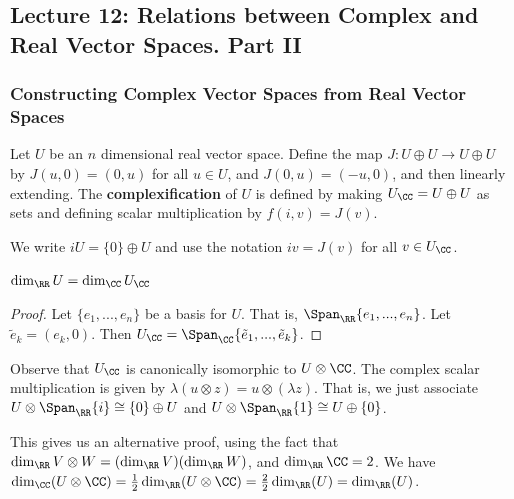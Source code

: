 \subsection{Lecture 12: Relations between Complex and Real Vector Spaces. Part II}
\subsubsection{Constructing Complex Vector Spaces from Real Vector Spaces}
\begin{defn}
    Let $U$ be an $n$ dimensional real vector space. Define the map $J : U\oplus U \to U\oplus U$ by $J(u,0) = (0,u)$ for all $u\in U$, and $J(0,u)=(-u,0)$, and then linearly extending. The \textbf{complexification} of $U$ is defined by making $U_{\CC} = U\oplus U$ as sets and defining scalar multiplication by $f(i,v) = J(v)$.
\end{defn}
\begin{remark*}
    We write $iU =\{0\}\oplus U$ and use the notation $iv = J(v)$ for all $v\in U_{\CC}$. 
\end{remark*}
\begin{lemma}
    $\dim_{\RR} U = \dim_{\CC} U_{\CC}$
\end{lemma}
\begin{proof}
    Let $\{e_1,...,e_n\}$ be a basis for $U$. That is, $\Span_{\RR}\{e_1,...,e_n\}$. Let $\tilde{e}_k = (e_k,0)$. Then $U_{\CC}=\Span_{\CC}\{\tilde{e}_1,...,\tilde{e}_k\}$.
\end{proof}
\begin{remark*}
    Observe that $U_{\CC}$ is canonically isomorphic to $U\otimes \CC$. The complex scalar multiplication is given by $\lambda (u\otimes z) = u\otimes(\lambda z)$. That is, we just associate $U\otimes \Span_{\RR}\{i\} \cong \{0\}\oplus U$ and $U\otimes\Span_{\RR}\{1\}\cong U\oplus \{0\}$.
\end{remark*}
\begin{remark*}
    This gives us an alternative proof, using the fact that $\dim_{\RR} V\otimes W = (\dim_{\RR} V )(\dim_{\RR}W)$, and $\dim_{\RR} \CC = 2$. We have $\dim_{\CC}(U\otimes \CC) = \frac{1}{2}\dim_{\RR}(U\otimes \CC) = \frac{2}{2}\dim_{\RR} (U) = \dim_{\RR}(U)$.
\end{remark*}

